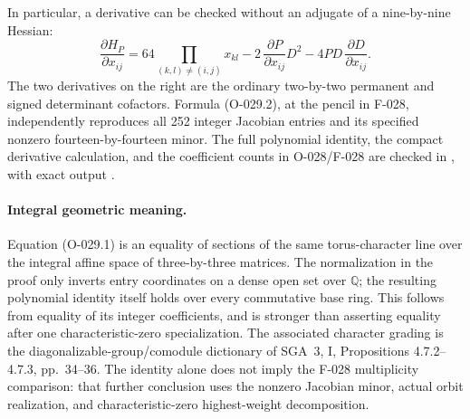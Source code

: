 In particular, a derivative can be checked without an
adjugate of a nine-by-nine Hessian:
\[
 \frac{\partial H_P}{\partial x_{ij}}
  =64\!\!\prod_{(k,l)\ne(i,j)}x_{kl}
      -2\,\frac{\partial P}{\partial x_{ij}}D^2
      -4PD\,\frac{\partial D}{\partial x_{ij}}.
                                                               \tag{O-029.2}
\]
The two derivatives on the right are the ordinary
two-by-two permanent and signed determinant cofactors.
Formula (O-029.2), at the pencil in F-028, independently
reproduces all 252 integer Jacobian entries and its
specified nonzero fourteen-by-fourteen minor.
The full polynomial identity, the compact derivative
calculation, and the coefficient counts in O-028/F-028
are checked in
,
with exact output
.

\paragraph{Integral geometric meaning.}
Equation (O-029.1) is an equality of sections of the
same torus-character line over the integral affine
space of three-by-three matrices.
The normalization in the proof only inverts entry
coordinates on a dense open set over \(\mathbb Q\);
the resulting polynomial identity itself holds over
every commutative base ring.
This follows from equality of its integer coefficients,
and is stronger than asserting equality after one
characteristic-zero specialization.
The associated character grading is the
diagonalizable-group/comodule dictionary of SGA~3, I,
Propositions 4.7.2--4.7.3, pp.~34--36.
The identity alone does not imply the F-028 multiplicity
comparison: that further conclusion uses the nonzero
Jacobian minor, actual orbit realization, and
characteristic-zero highest-weight decomposition.
